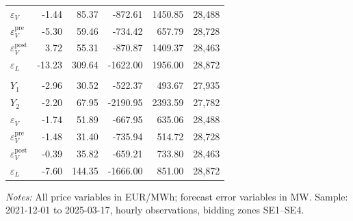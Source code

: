 \begin{table}[htbp]
\begin{threeparttable}
\begin{tabularx}{\linewidth}{>{\raggedright\arraybackslash}Xrrrrr}
$\varepsilon_V$ &    -1.44 &    85.37 &    -872.61 &    1450.85 & 28,488 \\
$\varepsilon_V^{\mathrm{pre}}$ &    -5.30 &    59.46 &    -734.42 &     657.79 & 28,728 \\
$\varepsilon_V^{\mathrm{post}}$ &     3.72 &    55.31 &    -870.87 &    1409.37 & 28,463 \\
$\varepsilon_L$ &   -13.23 &   309.64 &   -1622.00 &    1956.00 & 28,872 \\
\addlinespace
\multicolumn{6}{l}{\textit{SE4 --- Southern Sweden}} \\
\addlinespace[0.3ex]
$Y_1$ &    -2.96 &    30.52 &    -522.37 &     493.67 & 27,935 \\
$Y_2$ &    -2.20 &    67.95 &   -2190.95 &    2393.59 & 27,782 \\
$\varepsilon_V$ &    -1.74 &    51.89 &    -667.95 &     635.06 & 28,488 \\
$\varepsilon_V^{\mathrm{pre}}$ &    -1.48 &    31.40 &    -735.94 &     514.72 & 28,728 \\
$\varepsilon_V^{\mathrm{post}}$ &    -0.39 &    35.82 &    -659.21 &     733.80 & 28,463 \\
$\varepsilon_L$ &    -7.60 &   144.35 &   -1666.00 &     851.00 & 28,872 \\
\bottomrule
\end{tabularx}
\begin{tablenotes}[flushleft]
\footnotesize
\item \textit{Notes:} All price variables in EUR/MWh; forecast error variables in MW. Sample: 2021-12-01 to 2025-03-17, hourly observations, bidding zones SE1--SE4.
\end{tablenotes}
\end{threeparttable}
\end{table}


